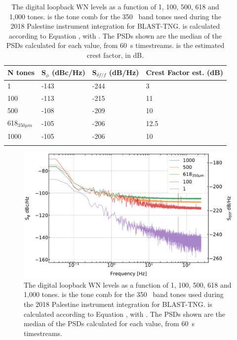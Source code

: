\begin{table}[!htbp]
\centering
\begin{tabular}{@{}llll@{}}
  \dtoprule{}
  N tones & S$_{\phi}$ (dBc/Hz) & S$_{\delta f / f}$ (dB/Hz) & Crest Factor est. (dB) \\ \midrule
  1 & -143 & -244 & 3 \\
  100 & -113 & -215 & 11 \\
  500 & -108 & -209 & 10 \\
  618$_{350\mu m}$ & -105 & -206 & 12.5 \\
  1000 & -105 & -206 & 10 \\ \dbottomrule{}
  \\
\end{tabular}
\caption[~Digital loopback noise levels as a function of number of probe tones.]{The digital loopback WN levels as a function of 1, 100, 500, 618 and 1,000 tones.  is the tone comb for the 350~ band tones used during the 2018 Palestine instrument integration for BLAST-TNG\@.  is calculated according to Equation \macrocapwrap{\ref{eq:Sff est}}, with . The PSDs shown are the median of the PSDs calculated for each  value, from 60~s timestreams.  is the estimated crest factor, in dB.}
\label{tab:dig loopback}
\end{table}

\begin{figure}[!htbp]
\centering
\includegraphics[width=\textwidth]{figures/readout/sim/LB_noise}
\caption[~Digital loopback WN levels as a function of 1, 100, 500, 618 and 1,000 tones.]{The digital loopback WN levels as a function of 1, 100, 500, 618 and 1,000 tones.  is the tone comb for the 350~ band tones used during the 2018 Palestine instrument integration for BLAST-TNG\@.  is calculated according to Equation \macrocapwrap{\ref{eq:Sff est}}, with . The PSDs shown are the median of the PSDs calculated for each  value, from 60~s timestreams.}
\label{fig:dig loopback noise}
\end{figure}

